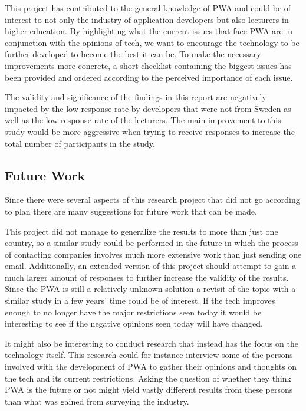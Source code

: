 \documentclass[a4paper,12pt]{article}
\begin{document}
This project has contributed to the general knowledge of PWA and could be of interest to not only the industry of application developers but also lecturers in higher education. By highlighting what the current issues that face PWA are in conjunction with the opinions of tech, we want to encourage the technology to be further developed to become the best it can be. To make the necessary improvements more concrete, a short checklist containing the biggest issues has been provided and ordered according to the perceived importance of each issue.

The validity and significance of the findings in this report are negatively impacted by the low response rate by developers that were not from Sweden as well as the low response rate of the lecturers. The main improvement to this study would be more aggressive when trying to receive responses to increase the total number of participants in the study.

\subsection{Future Work}
\label{Conclusions_futureWork}
Since there were several aspects of this research project that did not go according to plan there are many suggestions for future work that can be made. 

This project did not manage to generalize the results to more than just one country, so a similar study could be performed in the future in which the process of contacting companies involves much more extensive work than just sending one email. Additionally, an extended version of this project should attempt to gain a much larger amount of responses to further increase the validity of the results. Since the PWA is still a relatively unknown solution a revisit of the topic with a similar study in a few years' time could be of interest. If the tech improves enough to no longer have the major restrictions seen today it would be interesting to see if the negative opinions seen today will have changed. 

It might also be interesting to conduct research that instead has the focus on the technology itself. This research could for instance interview some of the persons involved with the development of PWA to gather their opinions and thoughts on the tech and its current restrictions. Asking the question of whether they think PWA is the future or not might yield vastly different results from these persons than what was gained from surveying the industry. 
\end{document}
